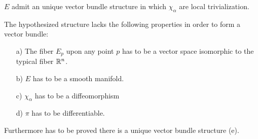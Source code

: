 \documentclass[a4paper,12pt]{scrartcl}    %
\begin{document}
\begin{theorem}
	\begin{thesis}
		$E$ admit an unique vector bundle structure in which $\chi_{\alpha}$ are local trivialization.
	\end{thesis}
\end{theorem}

The hypothesized structure lacks the following properties in order to form a vector bundle:
\begin{itemize}
\item[a)] The fiber $ E_p$ upon any point $p$ has to be a vector space isomorphic to the typical fiber $ \mathbb{R}^n$.

\item[b)] $E$ has to be a smooth manifold.

\item[c)] $\chi_\alpha$ has to be a diffeomorphism

\item[d)] $\pi$ has to be differentiable.
\end{itemize}
Furthermore has to be proved there is a unique vector bundle structure (e).
\end{document}
